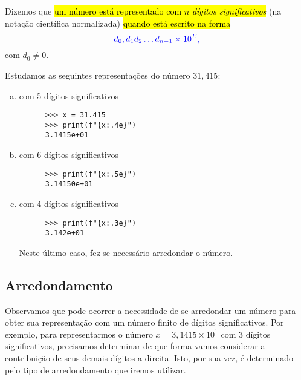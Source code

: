Dizemos que \hl{um número está representado com $n$ \emph{dígitos significativos}} (na notação científica normalizada) \hl{quando está escrito na forma}
\begin{equation}
  \color{blue}d_0,d_{1}d_{2}\ldots d_{n-1}\times 10^{E},
\end{equation}
com $d_0\neq 0$.

\begin{ex}
  Estudamos as seguintes representações do número $31,415$:
  \begin{enumerate}[a)]
  \item com 5 dígitos significativos
    \begin{lstlisting}
      >>> x = 31.415
      >>> print(f"{x:.4e}")
      3.1415e+01
    \end{lstlisting}
  \item com 6 dígitos significativos
    \begin{lstlisting}
      >>> print(f"{x:.5e}")
      3.14150e+01
    \end{lstlisting}
  \item com 4 dígitos significativos
    \begin{lstlisting}
      >>> print(f"{x:.3e}")
      3.142e+01
    \end{lstlisting}
    Neste último caso, fez-se necessário arredondar o número.
  \end{enumerate}
\end{ex}

\subsection{Arredondamento}

Observamos que pode ocorrer a necessidade de se arredondar um número para obter sua representação com um número finito de dígitos significativos. Por exemplo, para representarmos o número $x=3,1415\times 10^1$ com 3 dígitos significativos, precisamos determinar de que forma vamos considerar a contribuição de seus demais dígitos a direita. Isto, por sua vez, é determinado pelo tipo de arredondamento que iremos utilizar.

